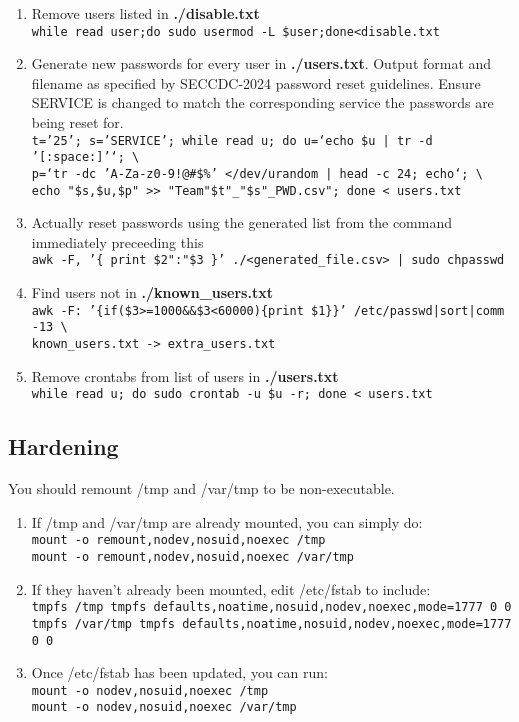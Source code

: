 \documentclass[12pt,letterpaper]{article}
\def\code#1{\textcolor{iris}{\texttt{#1}}}
\def\bf#1{\textbf{#1}}
\begin{document}
\begin{enumerate}
	\item Remove users listed in \bf{./disable.txt} \\
		\code{while read user;do sudo usermod -L \$user;done<disable.txt}
	\item Generate new passwords for every user in \bf{./users.txt}. Output format and filename as specified by SECCDC-2024 password reset guidelines. Ensure SERVICE is changed to match the corresponding service the passwords are being reset for. \\
		\code{t='25'; s='SERVICE'; while read u; do u=`echo \$u | tr -d '[:space:]'`; \textbackslash\\
		p=`tr -dc 'A-Za-z0-9!@\#\$\%' </dev/urandom | head -c 24; echo`; \textbackslash\\
		echo "\$s,\$u,\$p" >{}> "Team"\$t"\_"\$s"\_PWD.csv"; done < users.txt}
	\item Actually reset passwords using the generated list from the command immediately preceeding this \\
		\code{awk -F, '\{ print \$2":"\$3 \}' ./<generated\_file.csv> | sudo chpasswd}
	\item Find users not in \bf{./known\_users.txt} \\
		\code{awk -F: '\{if(\$3>{}=1000\&\&\$3<60000)\{print \$1\}\}' /etc/passwd|sort|comm -13 \textbackslash \\
		known\_users.txt -> extra\_users.txt}
	\item Remove crontabs from list of users in \bf{./users.txt} \\
		\code{while read u; do sudo crontab -u \$u -r; done < users.txt}
\end{enumerate}

\subsection{Hardening}

You should remount /tmp and /var/tmp to be non-executable.
\begin{enumerate}
	\item If /tmp and /var/tmp are already mounted, you can simply do: \code{ \\
		mount -o remount,nodev,nosuid,noexec /tmp \\
		mount -o remount,nodev,nosuid,noexec /var/tmp }
	\item If they haven't already been mounted, edit /etc/fstab to include: \code{ \\
		tmpfs /tmp tmpfs defaults,noatime,nosuid,nodev,noexec,mode=1777 0 0 \\
		tmpfs /var/tmp tmpfs defaults,noatime,nosuid,nodev,noexec,mode=1777 0 0 }
	\item Once /etc/fstab has been updated, you can run: \code{ \\
		mount -o nodev,nosuid,noexec /tmp \\
		mount -o nodev,nosuid,noexec /var/tmp }
\end{enumerate}
\end{document}
